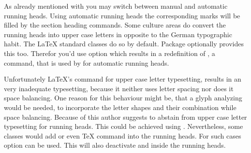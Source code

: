 \ifshortversion\IgnoreThistrue{}\fi
\ifIgnoreThis %
\else %
\begin{Declaration}
\end{Declaration}
As already mentioned with  you may switch between manual and
automatic running heads. Using automatic running heads the corresponding marks
will be filled by the section heading commands. Some culture areas do convert
the running heads into upper case letters in opposite to the German
typographic habit. The \LaTeX{} standard classes do so by default. Package
 optionally provides this too. Therefor you'd use option
 which results in a redefinition of
, a command, that is
used by  for automatic running heads.

Unfortunately \LaTeX's command for upper case letter typesetting,
 results in an very inadequate
typesetting, because it neither uses letter spacing nor does it space
balancing. One reason for this behaviour might be, that a glyph analyzing
would be needed, to incorporate the letter shapes and their combination while
space balancing. Because of this \KOMAScript{} author suggests to abstain from
upper case letter typesetting for running heads. This could be achieved using
. Nevertheless, some classes would add
 or even \TeX{} command  into the
running heads. For such cases option  can be
used. This will also deactivate  and 
inside the running heads.

